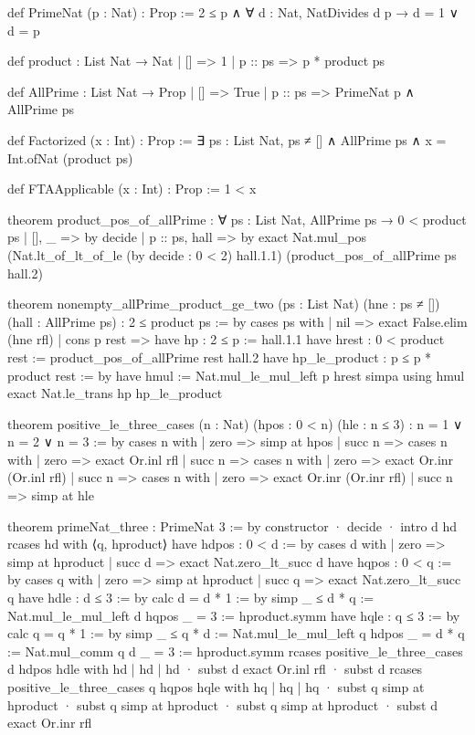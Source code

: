 \documentclass[11pt]{article}
\begin{document}
\begin{Vlean}
def PrimeNat (p : Nat) : Prop :=
  2 ≤ p ∧ ∀ d : Nat, NatDivides d p → d = 1 ∨ d = p

def product : List Nat → Nat
  | [] => 1
  | p :: ps => p * product ps

def AllPrime : List Nat → Prop
  | [] => True
  | p :: ps => PrimeNat p ∧ AllPrime ps

def Factorized (x : Int) : Prop :=
  ∃ ps : List Nat,
    ps ≠ [] ∧ AllPrime ps ∧ x = Int.ofNat (product ps)

def FTAApplicable (x : Int) : Prop :=
  1 < x

theorem product_pos_of_allPrime :
    ∀ ps : List Nat, AllPrime ps → 0 < product ps
  | [], _ => by decide
  | p :: ps, hall => by
      exact Nat.mul_pos
        (Nat.lt_of_lt_of_le (by decide : 0 < 2) hall.1.1)
        (product_pos_of_allPrime ps hall.2)

theorem nonempty_allPrime_product_ge_two
    (ps : List Nat) (hne : ps ≠ []) (hall : AllPrime ps) :
    2 ≤ product ps := by
  cases ps with
  | nil => exact False.elim (hne rfl)
  | cons p rest =>
      have hp : 2 ≤ p := hall.1.1
      have hrest : 0 < product rest :=
        product_pos_of_allPrime rest hall.2
      have hp_le_product : p ≤ p * product rest := by
        have hmul := Nat.mul_le_mul_left p hrest
        simpa using hmul
      exact Nat.le_trans hp hp_le_product

theorem positive_le_three_cases
    (n : Nat) (hpos : 0 < n) (hle : n ≤ 3) :
    n = 1 ∨ n = 2 ∨ n = 3 := by
  cases n with
  | zero => simp at hpos
  | succ n =>
      cases n with
      | zero => exact Or.inl rfl
      | succ n =>
          cases n with
          | zero => exact Or.inr (Or.inl rfl)
          | succ n =>
              cases n with
              | zero => exact Or.inr (Or.inr rfl)
              | succ n => simp at hle

theorem primeNat_three : PrimeNat 3 := by
  constructor
  · decide
  · intro d hd
    rcases hd with ⟨q, hproduct⟩
    have hdpos : 0 < d := by
      cases d with
      | zero => simp at hproduct
      | succ d => exact Nat.zero_lt_succ d
    have hqpos : 0 < q := by
      cases q with
      | zero => simp at hproduct
      | succ q => exact Nat.zero_lt_succ q
    have hdle : d ≤ 3 := by
      calc
        d = d * 1 := by simp
        _ ≤ d * q := Nat.mul_le_mul_left d hqpos
        _ = 3 := hproduct.symm
    have hqle : q ≤ 3 := by
      calc
        q = q * 1 := by simp
        _ ≤ q * d := Nat.mul_le_mul_left q hdpos
        _ = d * q := Nat.mul_comm q d
        _ = 3 := hproduct.symm
    rcases positive_le_three_cases d hdpos hdle with hd | hd | hd
    · subst d
      exact Or.inl rfl
    · subst d
      rcases positive_le_three_cases q hqpos hqle with hq | hq | hq
      · subst q
        simp at hproduct
      · subst q
        simp at hproduct
      · subst q
        simp at hproduct
    · subst d
      exact Or.inr rfl


\end{Vlean}
\end{document}
